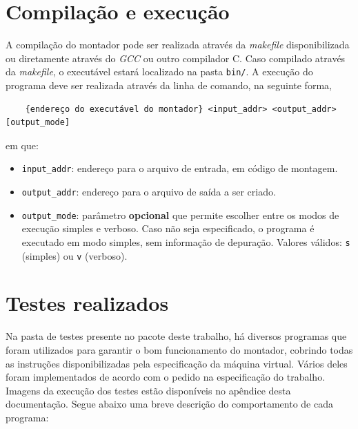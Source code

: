 \documentclass[10pt,a4paper]{article}
\numberwithin{equation}{section}
\begin{document}
\section{Compilação e execução}

A compilação do montador pode ser realizada através da \emph{makefile} disponibilizada ou diretamente através do \emph{GCC} ou outro compilador C. Caso compilado através da \emph{makefile}, o executável estará localizado na pasta \verb|bin/|. A execução do programa deve ser realizada através da linha de comando, na seguinte forma,

\begin{verbatim}
    {endereço do executável do montador} <input_addr> <output_addr> [output_mode]
\end{verbatim}

em que:

\begin{itemize}
    \item \verb|input_addr|: endereço para o arquivo de entrada, em código de montagem.
    \item \verb|output_addr|: endereço para o arquivo de saída a ser criado.
    \item \verb|output_mode|: parâmetro \textbf{opcional} que permite escolher entre os modos de execução simples e verboso. Caso não seja especificado, o programa é executado em modo simples, sem informação de depuração. Valores válidos: \verb|s| (simples) ou \verb|v| (verboso).
\end{itemize}

\section{Testes realizados}

Na pasta de testes presente no pacote deste trabalho, há diversos programas que foram utilizados para garantir o bom funcionamento do montador, cobrindo todas as instruções disponibilizadas pela especificação da máquina virtual. Vários deles foram implementados de acordo com o pedido na especificação do trabalho. Imagens da execução dos testes estão disponíveis no apêndice desta documentação. Segue abaixo uma breve descrição do comportamento de cada programa:
\end{document}
